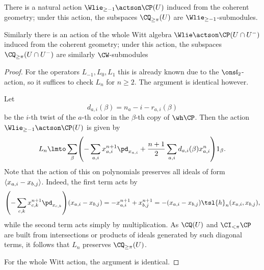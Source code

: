 \documentclass[11pt,reqno]{amsart}
\newcommand{\h}{\tsl{h}}
\begin{document}
\begin{proposition}\label{prop:halfwitt preserves Qk}
    There is a natural action $\Wlie_{\ge-1}\actson \CP(U)$ induced from the coherent geometry; under this action, the subspaces $\CQ_{\ge\pi}(U)$ are $\Wlie_{\ge-1}$-submodules.

    Similarly there is an action of the whole Witt algebra $\Wlie\actson \CP(U\cap U^-)$ induced from the coherent geometry; under this action, the subspaces $\CQ_{\ge\pi}(U\cap U^-)$ are similarly $\CW$-submodules
\end{proposition}
\begin{proof}
    For the operators $L_{-1},L_0,L_1$ this is already known due to the $\sl_2$-action, so it suffices to check $L_n$ for $n\ge 2$. The argument is identical however. 

    Let
    \[d_{a,i}(\beta)=n_a-i-r_{a,i}(\beta)\] 
    be the $i$-th twist of the $a$-th color in the $\beta$-th copy of $\wh\CP$. Then the action $\Wlie_{\ge-1}\actson \CP(U)$ is given by
    \[L_n\lmto \sum_\beta \pr*{-\sum_{a,i} x_{a,i}^{n+1}\pd_{x_{a,i}}+\frac{n+1}{2}\sum_{a,i}d_{a,i}(\beta)x_{a,i}^n}1_\beta.\] 
    Note that the action of this on polynomials preserves all ideals of form $\langle x_{a,i}-x_{b,j}\rangle$. Indeed, the first term acts by
    \[\pr*{-\sum_{c,k}x_{c,k}^{n+1}\pd_{x_{c,k}}}(x_{a,i}-x_{b,j})=-x_{a,i}^{n+1}+x_{b,j}^{n+1}=-(x_{a,i}-x_{b,j}) \h_n(x_{a,i},x_{b,j}),\]
    while the second term acts simply by multiplication. As $\CQ(U)$ and $\CI_{<\pi}\CP$ are built from intersections or products of ideals generated by such diagonal terms, it follows that $L_n$ preserves $\CQ_{\ge\pi}(U)$.

    For the whole Witt action, the argument is identical.
\end{proof}
\end{document}
